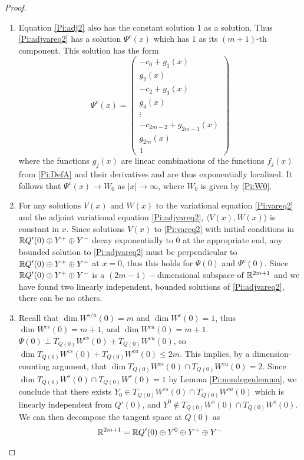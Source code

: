 \documentclass[thesis.tex]{subfiles}
\begin{document}
\begin{lemma:varadjsolutions}
\begin{proof}
\begin{enumerate}
\item Equation \eqref{Pi:adj2} also has the constant solution 1 as a solution. Thus \eqref{Pi:adjvareq2} has a solution $\Psi^c(x)$ which has $1$ as its $(m+1)$-th component. This solution has the form
\[
\Psi^c(x) = \begin{pmatrix}
-c_0 + g_1(x) \\ g_2(x) \\
-c_2 + g_3(x) \\ g_4(x) \\
\vdots \\
-c_{2m-2} + g_{2m-1}(x) \\ g_{2m}(x) \\ 1
\end{pmatrix}
\]
where the functions $g_j(x)$ are linear combinations of the functions $f_j(x)$ from \eqref{Pi:DefA} and their derivatives and are thus exponentially localized. It follows that $\Psi^c(x) \rightarrow W_0$ as $|x| \rightarrow \infty$, where $W_0$ is given by \eqref{Pi:W0}.

\item For any solutions $V(x)$ and $W(x)$ to the variational equation \eqref{Pi:vareq2} and the adjoint variational equation \eqref{Pi:adjvareq2}, $\langle V(x), W(x) \rangle$ is constant in $x$. Since solutions $V(x)$ to \eqref{Pi:vareq2} with initial conditions in ${\mathbb R} Q'(0) \oplus Y^+ \oplus Y^-$ decay exponentially to 0 at the appropriate end, any bounded solution to \eqref{Pi:adjvareq2} must be perpendicular to ${\mathbb R} Q'(0) \oplus Y^+ \oplus Y^-$ at $x = 0$, thus this holds for $\Psi(0)$ and $\Psi^c(0)$. Since ${\mathbb R} Q'(0) \oplus Y^+ \oplus Y^-$ is a $(2m-1)-$dimensional subspace of ${\mathbb R}^{2m+1}$ and we have found two linearly independent, bounded solutions of \eqref{Pi:adjvareq2}, there can be no others.

\item Recall that $\dim W^{s/u}(0) = m$ and $\dim W^c(0) = 1$, thus $\dim W^{cs}(0) = m + 1$, and $\dim W^{cu}(0) = m + 1$. $\Psi(0) \perp T_{Q(0)}W^{cs}(0) + T_{Q(0)}W^{cu}(0)$, so $\dim T_{Q(0)}W^{cs}(0) + T_{Q(0)}W^{cu}(0) \leq 2m$. This implies, by a dimension-counting argument, that $\dim T_{Q(0)}W^{cs}(0) \cap T_{Q(0)}W^{cu}(0) = 2$. Since $\dim T_{Q(0)}W^s(0) \cap T_{Q(0)}W^s(0) = 1$ by Lemma \ref{Pi:nondegenlemma}, we conclude that there exists $Y_0 \in T_{Q(0)}W^{cs}(0) \cap T_{Q(0)}W^{cu}(0)$ which is linearly independent from $Q'(0)$, and $Y^0 \notin T_{Q(0)}W^s(0) \cap T_{Q(0)}W^s(0)$. We can then decompose the tangent space at $Q(0)$ as 
\[
{\mathbb R}^{2m + 1} = {\mathbb R} Q'(0) \oplus Y^0 \oplus Y^+ \oplus Y^-
\]


\end{enumerate}
\end{proof}
\end{lemma:varadjsolutions}
\end{document}
